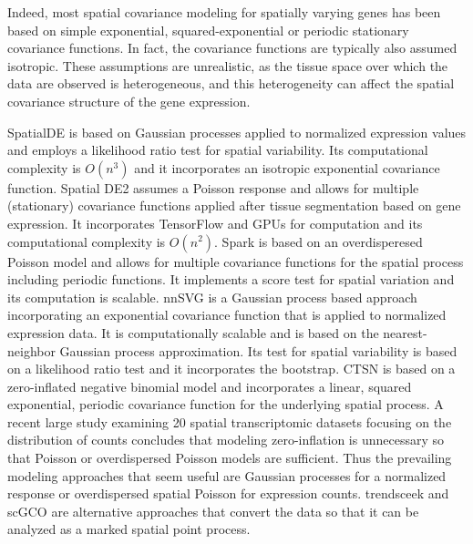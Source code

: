 \documentclass[pdflatex,sn-mathphys-num]{sn-jnl}%
\theoremstyle{thmstyleone}%
\theoremstyle{thmstyletwo}%
\theoremstyle{thmstylethree}%
\begin{document}
Indeed, most spatial covariance modeling for spatially varying genes has been based on simple exponential, squared-exponential or periodic stationary covariance functions. In fact, the covariance functions are typically also assumed isotropic. These assumptions are unrealistic, as the tissue space over which the data are observed is heterogeneous, and this heterogeneity can affect the spatial covariance structure of the gene expression.

SpatialDE \cite{svensson2018spatialde} is based on Gaussian processes applied to normalized expression values and employs a likelihood ratio test for spatial variability. Its computational complexity is $O(n^{3})$ and it incorporates an isotropic exponential covariance function. Spatial DE2 \cite{kats2021spatialde2} assumes a Poisson response and allows for multiple (stationary) covariance functions applied after tissue segmentation based on gene expression. It incorporates TensorFlow and GPUs for computation and its computational complexity is $O(n^{2})$. Spark \cite{sun2020statistical} is based on an overdisperesed Poisson model and allows for multiple covariance functions for the spatial process including periodic functions. It implements a score test for spatial variation and its computation is scalable. nnSVG \cite{weber2023nnsvg} is a Gaussian process based approach incorporating an exponential covariance function that is applied to normalized expression data. It is computationally scalable and is based on the nearest-neighbor Gaussian process approximation. Its test for spatial variability is based on a likelihood ratio test and it incorporates the bootstrap. CTSN \cite{yu2022identification} is based on a zero-inflated negative binomial model and incorporates a linear, squared exponential, periodic covariance function for the underlying spatial process. A recent large study \cite{zhao2022modeling} examining 20 spatial transcriptomic datasets focusing on the distribution of counts concludes that modeling zero-inflation is unnecessary so that Poisson or overdispersed Poisson models are sufficient. Thus the prevailing modeling approaches that seem useful are Gaussian processes for a normalized response or overdispersed spatial Poisson for expression counts. trendsceek \cite{edsgard2018identification} and scGCO \cite{zhang2022identification} are alternative approaches that convert the data so that it can be analyzed as a marked spatial point process.
\end{document}
